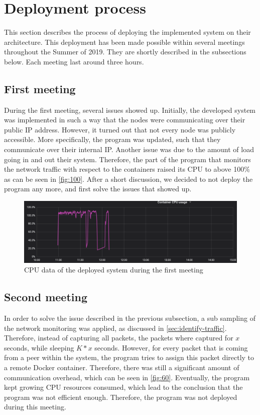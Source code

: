 \section{Deployment process} \label{sec:sb-process}
This section describes the process of deploying the implemented system on their architecture. This deployment has been made possible within several meetings throughout the Summer of 2019. They are shortly described in the subsections below. Each meeting last around three hours.

\subsection{First meeting}
During the first meeting, several issues showed up. Initially, the developed system was implemented in such a way that the nodes were communicating over their public IP address. However, it turned out that not every node was publicly accessible. More specifically, the program was updated, such that they communicate over their internal IP. Another issue was due to the amount of load going in and out their system. Therefore, the part of the program that monitors the network traffic with respect to the containers raised its CPU to above 100\% as can be seen in \autoref{fig:100}. After a short discussion, we decided to not deploy the program any more, and first solve the issues that showed up.

\begin{figure}
    \centering
    \includegraphics[width=\textwidth]{gfx/load-100.png}
    \caption{CPU data of the deployed system during the first meeting}
    \label{fig:100}
\end{figure}

\subsection{Second meeting}
In order to solve the issue described in the previous subsection, a sub sampling of the network monitoring was applied, as discussed in \autoref{sec:identify-traffic}. Therefore, instead of capturing all packets, the packets where captured for $x$ seconds, while sleeping $K*x$ seconds. However, for every packet that is coming from a peer within the system, the program tries to assign this packet directly to a remote Docker container. Therefore, there was still a significant amount of communication overhead, which can be seen in \autoref{fig:60}. Eventually, the program kept growing CPU resources consumed, which lead to the conclusion that the program was not efficient enough. Therefore, the program was not deployed during this meeting.

